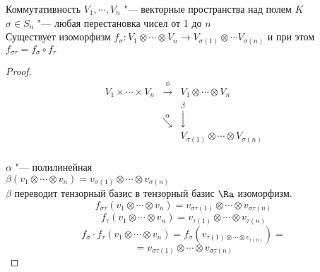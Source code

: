 \begin{theorem}{Коммутативность} \hfill
$V_1, \cdots, V_n$ "--- векторные пространства над полем $K$\\
$\sigma \in S_n$ "--- любая перестановка чисел от 1 до $n$\\
Существует изоморфизм $f_{\sigma}\colon V_1 \otimes \cdots \otimes V_n \to V_{\sigma(1)} \otimes \cdots V_{\sigma(n)}$
и при этом  $f_{\sigma \tau} = f_{\sigma} \circ f_{\tau}$
\end{theorem}
\begin{proof}
$$
\begin{matrix}
V_1 \times \cdots \times V_n& \overset{\phi}{\rightarrow}& V_1 \otimes \cdots \otimes V_n\\
&\overset{\alpha}{\searrow}&\overset{\beta}{\downarrow}\\
&&V_{\sigma(1)} \otimes \cdots \otimes V_{\sigma(n)}\\
\end{matrix}
$$

$\alpha$ "--- полилинейная \\
$\beta(v_1 \otimes \cdots \otimes v_n) = v_{\sigma(1)} \otimes \cdots \otimes v_{\sigma(n)}$\\
$\beta$ переводит тензорный базис в тензорный базис $\Ra$ изоморфизм.\\

$$f_{\sigma \tau}(v_1 \otimes \cdots \otimes v_n) = v_{\sigma\tau(1)} \otimes \cdots \otimes v_{\sigma \tau(n)}$$
$$f_{\tau}(v_1 \otimes \cdots \otimes v_n) = v_{\tau(1)} \otimes \cdots \otimes v_{\tau(n)} $$
$$f_{\sigma}\cdot f_{\tau}(v_1 \otimes \cdots \otimes v_n) = f_{\sigma}(v_{\tau(1) \otimes \cdots \otimes v_{\tau(n)}}) =$$
$$= v_{\sigma\tau(1)} \otimes \cdots \otimes v_{\sigma \tau(n)}$$
\end{proof}

